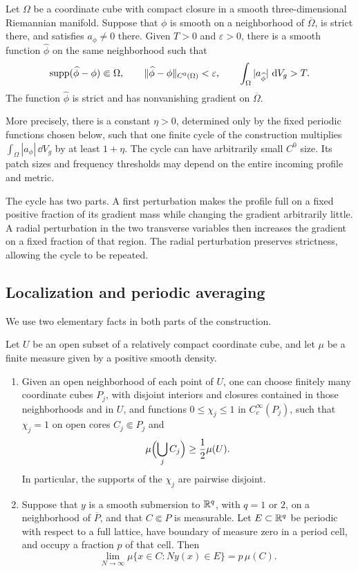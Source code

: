 \begin{proposition}
\label{prop:profile-amplification}
Let $\Omega$ be a coordinate cube with compact closure in a smooth
three-dimensional Riemannian manifold.  Suppose that $\phi$ is smooth on a
neighborhood of $\overline\Omega$, is strict there, and satisfies
$a_\phi\ne0$ there.  Given $T>0$ and $\varepsilon>0$, there is a smooth
function $\widehat\phi$ on the same neighborhood such that
\[
 \operatorname{supp}(\widehat\phi-\phi)\Subset\Omega,\qquad
 \|\widehat\phi-\phi\|_{C^0(\Omega)}<\varepsilon,
 \qquad
 \int_\Omega |a_{\widehat\phi}|\,\,\mathrm d V_g>T.
\]
The function $\widehat\phi$ is strict and has nonvanishing gradient on
$\overline\Omega$.

More precisely, there is a constant $\eta>0$, determined only by the fixed
periodic functions chosen below, such that one finite cycle of the
construction multiplies
$\int_\Omega|a_\phi|\,\dd V_g$ by at least $1+\eta$.  The cycle can have
arbitrarily small $C^0$ size.  Its patch sizes and frequency thresholds may
depend on the entire incoming profile and metric.
\end{proposition}

The cycle has two parts.  A first perturbation makes the profile full on a
fixed positive fraction of its gradient mass while changing the gradient
arbitrarily little.  A radial perturbation in the two transverse variables
then increases the gradient on a fixed fraction of that region.  The radial
perturbation preserves strictness, allowing the cycle to be repeated.

\subsection{Localization and periodic averaging}

We use two elementary facts in both parts of the construction.

\begin{lemma}
\label{lem:profile-localization}
Let $U$ be an open subset of a relatively compact coordinate cube, and let
$\mu$ be a finite measure given by a positive smooth density.
\begin{enumerate}
 \item Given an open neighborhood of each point of $U$, one can choose
 finitely many coordinate cubes $P_j$, with disjoint interiors and closures
 contained in those neighborhoods and in $U$, and functions
 $0\le\chi_j\le1$ in $C_c^\infty(P_j)$, such that $\chi_j=1$ on open
 cores $C_j\Subset P_j$ and
 \[
   \mu\Bigl(\bigcup_j C_j\Bigr)\ge\frac12\mu(U).
 \]
 In particular, the supports of the $\chi_j$ are pairwise disjoint.
 \item Suppose that $y$ is a smooth submersion to $\mathbb R^q$, with $q=1$ or
 $2$, on a neighborhood of $\overline P$, and that $C\Subset P$ is
 measurable.  Let $E\subset\mathbb R^q$ be periodic with respect to a full
 lattice, have boundary of measure zero in a period cell, and occupy a
 fraction $p$ of that cell.  Then
 \[
  \lim_{N\to\infty}
  \mu\{x\in C:Ny(x)\in E\}=p\,\mu(C).
 \]
\end{enumerate}
\end{lemma}

